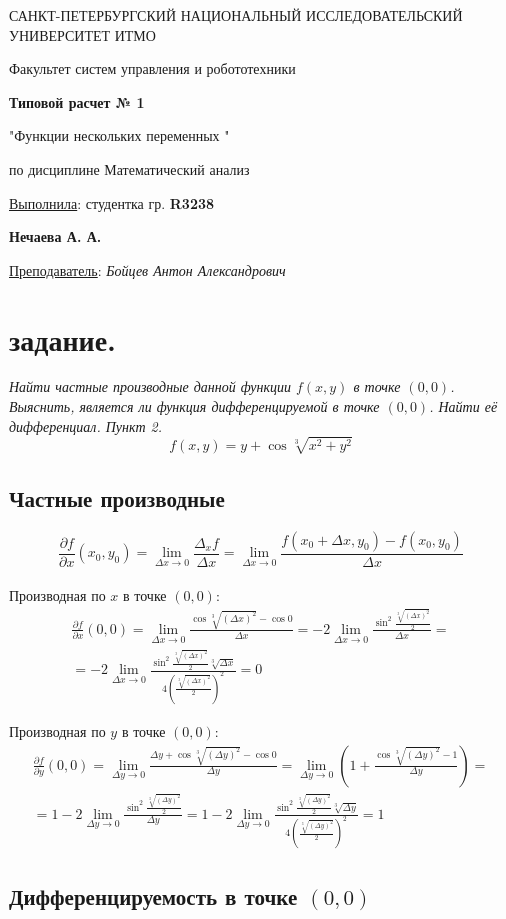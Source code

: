 \documentclass[a5paper, 10pt]{article}
\theoremstyle{definition}
\theoremstyle{plain}
\theoremstyle{remark}
\newcommand*{\titlePage}{
	\thispagestyle{title}
	\begingroup
	\begin{center}
		\vspace*{6ex}
		
		{\small
			САНКТ-ПЕТЕРБУРГСКИЙ НАЦИОНАЛЬНЫЙ ИССЛЕДОВАТЕЛЬСКИЙ УНИВЕРСИТЕТ ИТМО	
		}
		
		\vspace*{2ex}
		
		{\normalsize
			Факультет систем управления и робототехники
		}
		
		\vspace*{15ex}
		
		{\Large \bfseries 
			Типовой расчет № 1
		}
\vspace*{2ex}
	{\Large \bfseries 
			
"Функции нескольких переменных "
		}
\vspace*{2ex}
		
		{\normalsize
			по дисциплине Математический анализ
		}

	\end{center}
	\vspace*{20ex}
	\begin{flushright}
		{\large 
			\underline{Выполнила}: студентка гр. \textbf{R3238}\\
			\begin{flushright}
				\textbf{Нечаева А. А.}\\
			\end{flushright}
		}
		
		\vspace*{5ex}
		
		{\large 
			\underline{Преподаватель}: \textit{Бойцев Антон Александрович}
		}
	\end{flushright}	
	\newpage
	\setcounter{page}{1}
	\endgroup}
\begin{document}
	\titlePage
	\pagestyle{style}
\newpage

\section{задание.}
\textit{Найти частные производные данной функции $f(x, y)$ в точке $(0, 0)$. Выяснить, является ли функция дифференцируемой в точке $(0, 0)$. Найти её дифференциал. Пункт 2.}
\begin{equation}
f(x, y) = y + \cos \sqrt[3]{x^2 + y^2}
\end{equation}
\subsection{Частные производные}

\begin{equation}
\frac{\partial f}{\partial x} (x_0, y_0) = \lim_{\Delta x \to 0} \frac{\Delta_x f}{\Delta x} = \lim_{\Delta x \to 0} \frac{f ( x_0 + \Delta x, y_0) - f(x_0, y_0)}{\Delta x}
\end{equation}
\\

Производная по $x$ в точке $(0, 0)$:
\begin{multline}
\frac{\partial f}{\partial x} (0, 0) = \lim_{\Delta x \to 0} \frac{\cos \sqrt[3]{( \Delta x)^2} - \cos 0}{\Delta x} = 
-2 \lim_{\Delta x \to 0} \frac{\sin^2  \frac{ \sqrt[3]{( \Delta x)^2}}{2}}{\Delta x} =\\
= -2 \lim_{\Delta x \to 0} \frac{\sin^2  \frac{ \sqrt[3]{( \Delta x)^2}}{2} \sqrt[3]{ \Delta x}}{4 \left(\frac{ \sqrt[3]{( \Delta x)^2}}{2} \right)^2} = 0
\end{multline}


Производная по $y$ в точке $(0, 0)$:
\begin{multline}
\frac{\partial f}{\partial y} (0, 0) = \lim_{\Delta y \to 0} \frac{\Delta y + \cos \sqrt[3]{( \Delta y)^2} - \cos 0}{\Delta y} = 
\lim_{\Delta y \to 0} \left(1 +  \frac{\cos \sqrt[3]{( \Delta y)^2} - 1}{\Delta y} \right) =\\
= 1 - 2 \lim_{\Delta y \to 0} \frac{\sin^2  \frac{ \sqrt[3]{( \Delta y)^2}}{2}}{\Delta y} 
=1 -2 \lim_{\Delta y \to 0} \frac{\sin^2  \frac{ \sqrt[3]{( \Delta y)^2}}{2} \sqrt[3]{ \Delta y}}{4 \left(\frac{ \sqrt[3]{( \Delta y)^2}}{2} \right)^2} = 1
\end{multline}


\subsection{Дифференцируемость в точке  $(0, 0)$}
\end{document}
